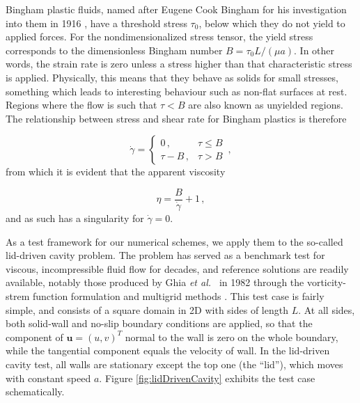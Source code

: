 \documentclass[final,3p,twocolumn]{elsarticle}
\begin{document}
Bingham plastic fluids, named after Eugene Cook Bingham for his investigation
into them in 1916 \cite{bingham1916investigation}, have a threshold stress
$\tau_0$, below which they do not yield to applied forces. For the
nondimensionalized stress tensor, the yield stress corresponds to the
dimensionless Bingham number $B = \tau_0 L/(\mu a)$. In other words, the strain
rate is zero unless a stress higher than that characteristic stress is applied.
Physically, this means that they behave as solids for small stresses, something
which leads to interesting behaviour such as non-flat surfaces at rest. Regions
where the flow is such that $\tau < B$ are also known as unyielded
regions. The relationship between stress and shear rate for Bingham plastics is
therefore

\begin{equation}
    \dot{\gamma} = \begin{cases}
        0 \,,& \tau \leq B \\ 
        \tau - B \,,& \tau > B \end{cases} \,,
    \label{eq:bingham}
\end{equation}
%
from which it is evident that the apparent viscosity 

\begin{equation}
    \eta = \frac{B}{\dot{\gamma}} + 1 \,,
    \label{eq:binghamViscosity}
\end{equation}
%
and as such has a singularity for $\dot{\gamma}=0$. 

As a test framework for our numerical schemes, we apply them to the so-called
lid-driven cavity problem. The problem has served as a benchmark test for
viscous, incompressible fluid flow for decades, and reference solutions are
readily available, notably those produced by Ghia {\em et al.\ } in 1982
through the vorticity-strem function formulation and multigrid methods
\cite{ghia1982high}. This test case is fairly simple, and consists of a square
domain in 2D with sides of length $L$. At all sides, both solid-wall and
no-slip boundary conditions are applied, so that the component of $\bm{u} =
(u,v)^T$ normal to the wall is zero on the whole boundary, while the tangential
component equals the velocity of wall. In the lid-driven cavity test, all walls
are stationary except the top one (the ``lid''), which moves with constant
speed $a$. Figure \ref{fig:lidDrivenCavity} exhibits the test case
schematically. 
\end{document}
